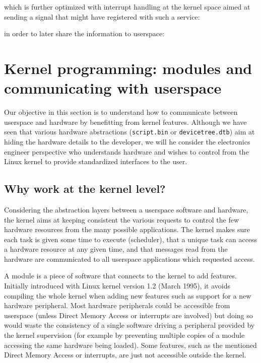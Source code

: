 \documentclass{article}
\begin{document}
{

which is further optimized with interrupt handling at the kernel space aimed at sending
a signal that might have registered with such a service:



in order to later share the information to userspace:






\section{Kernel programming: modules and communicating with userspace}

Our objective in this section is to understand how to communicate between userspace
and hardware by benefitting from kernel features. Although we have seen that various
hardware abstractions ({\tt script.bin} or {\tt devicetree.dtb}) aim at hiding
the hardware details to the developer, we will he consider the electronics engineer
perspective who understands hardware and wishes to control from the Linux kernel
to provide standardized interfaces to the user.

\subsection{Why work at the kernel level?}

Considering the abstraction layers between a userspace software and hardware, the
kernel aims at keeping consistent the various requests to control the few hardware resources
from the many possible applications. The kernel makes sure each task is
given some time to execute (scheduler), that a unique task can access a hardware
resource at any given time, and that messages read from the hardware are communicated
to all userspace applications which requested access.

A module \cite{ldd3} is a piece of software that connects to the kernel
to add features. Initially introduced with Linux kernel version 1.2 (March 1995),
it avoids compiling the whole kernel when adding new features such as support
for a new hardware peripheral. Most hardware peripherals could be accessible
from userspace (unless Direct Memory Access or interrupts are involved) but doing
so would waste the consistency of a single software driving a peripheral provided
by the kernel supervision (for example by preventing multiple copies of a module
accessing the same hardware being loaded). Some features, such as the mentioned
Direct Memory Access or interrupts, are just not accessible outside the kernel.

}
\end{document}
